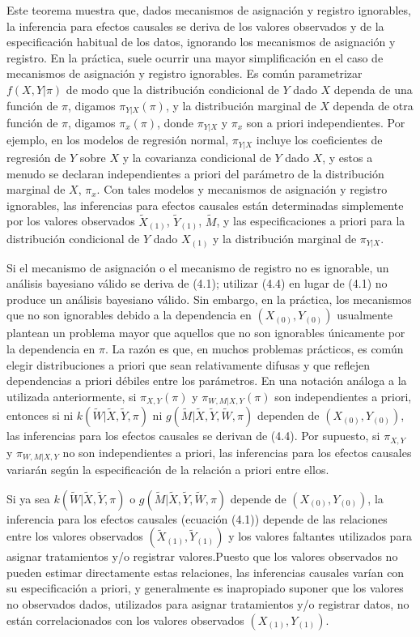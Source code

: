 \documentclass[12pt,a4paper]{article}
\begin{document}
Este teorema muestra que, dados mecanismos de asignación y registro ignorables, la inferencia para efectos causales se deriva de los valores observados y de la especificación habitual de los datos, ignorando los mecanismos de asignación y registro. En la práctica, suele ocurrir una mayor simplificación en el caso de mecanismos de asignación y registro ignorables. Es común parametrizar $f(X,Y|\pi)$ de modo que la distribución condicional de $Y$ dado $X$ dependa de una función de $\pi$, digamos $\pi_{Y|X}(\pi)$, y la distribución marginal de $X$ dependa de otra función de $\pi$, digamos $\pi_{x}(\pi)$, donde $\pi_{Y|X}$ y $\pi_{x}$ son a priori independientes.  Por ejemplo, en los modelos de regresión normal, $\pi_{Y|X}$ incluye los coeficientes de regresión de $Y$ sobre $X$ y la covarianza condicional de $Y$ dado $X$, y estos a menudo se declaran independientes a priori del parámetro de la distribución marginal de $X$, $\pi_{x}$. Con tales modelos y mecanismos de asignación y registro ignorables, las inferencias para efectos causales están determinadas simplemente por los valores observados $\tilde{X}_{(1)}$, $\tilde{Y}_{(1)}$, $\tilde{M}$, y las especificaciones a priori para la distribución condicional de $Y$ dado $X_{(1)}$ y la distribución marginal de $\pi_{Y|X}$. 

Si el mecanismo de asignación o el mecanismo de registro no es ignorable, un análisis bayesiano válido se deriva de (4.1); utilizar (4.4) en lugar de (4.1) no produce un análisis bayesiano válido.  Sin embargo, en la práctica, los mecanismos que no son ignorables debido a la dependencia en $(X_{(0)},Y_{(0)})$ usualmente plantean un problema mayor que aquellos que no son ignorables únicamente por la dependencia en $\pi$. La razón es que, en muchos problemas prácticos, es común elegir distribuciones a priori que sean relativamente difusas y que reflejen dependencias a priori débiles entre los parámetros. En una notación análoga a la utilizada anteriormente, si $\pi_{X,Y}(\pi)$ y $\pi_{W,M|X,Y}(\pi)$ son independientes a priori, entonces si ni $k(\tilde{W}|\tilde{X},\tilde{Y},\pi)$ ni $g(\tilde{M}|\tilde{X},\tilde{Y},\tilde{W},\pi)$ dependen de $(X_{(0)},Y_{(0)})$, las inferencias para los efectos causales se derivan de (4.4). Por supuesto, si $\pi_{X,Y}$ y $\pi_{W,M|X,Y}$ no son independientes a priori, las inferencias para los efectos causales variarán según la especificación de la relación a priori entre ellos. %

Si ya sea $k(\tilde{W}|\tilde{X},\tilde{Y},\pi)$ o $g(\tilde{M}|\tilde{X},\tilde{Y},\tilde{W},\pi)$ depende de $(X_{(0)},Y_{(0)})$, la inferencia para los efectos causales (ecuación (4.1)) depende de las relaciones entre los valores observados $(\tilde{X}_{(1)},\tilde{Y}_{(1)})$ y los valores faltantes utilizados para asignar tratamientos y/o registrar valores.Puesto que los valores observados no pueden estimar directamente estas relaciones, las inferencias causales varían con su especificación a priori, y generalmente es inapropiado suponer que los valores no observados dados, utilizados para asignar tratamientos y/o registrar datos, no están correlacionados con los valores observados $(X_{(1)},Y_{(1)})$. 
\end{document}
